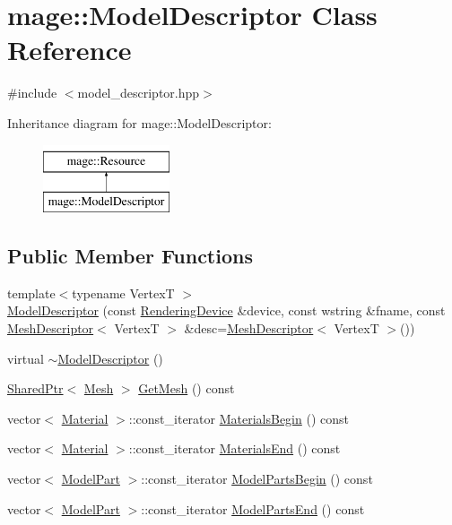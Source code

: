 \hypertarget{classmage_1_1_model_descriptor}{}\section{mage\+:\+:Model\+Descriptor Class Reference}
\label{classmage_1_1_model_descriptor}


{\ttfamily \#include $<$model\+\_\+descriptor.\+hpp$>$}

Inheritance diagram for mage\+:\+:Model\+Descriptor\+:\begin{figure}[H]
\begin{center}
\leavevmode
\includegraphics[height=2.000000cm]{classmage_1_1_model_descriptor}
\end{center}
\end{figure}
\subsection*{Public Member Functions}
\begin{DoxyCompactItemize}
\item 
{\footnotesize template$<$typename VertexT $>$ }\\\hyperlink{classmage_1_1_model_descriptor_afbaa21bc79c40d3448c83a23c134ef2c}{Model\+Descriptor} (const \hyperlink{classmage_1_1_rendering_device}{Rendering\+Device} \&device, const wstring \&fname, const \hyperlink{structmage_1_1_mesh_descriptor}{Mesh\+Descriptor}$<$ VertexT $>$ \&desc=\hyperlink{structmage_1_1_mesh_descriptor}{Mesh\+Descriptor}$<$ VertexT $>$())
\item 
virtual \hyperlink{classmage_1_1_model_descriptor_a3bc8ee3d1cb8d2675374727edce3d593}{$\sim$\+Model\+Descriptor} ()
\item 
\hyperlink{namespacemage_a1e01ae66713838a7a67d30e44c67703e}{Shared\+Ptr}$<$ \hyperlink{classmage_1_1_mesh}{Mesh} $>$ \hyperlink{classmage_1_1_model_descriptor_a325f0e58fda7734ace7a0e296e0d970d}{Get\+Mesh} () const
\item 
vector$<$ \hyperlink{structmage_1_1_material}{Material} $>$\+::const\+\_\+iterator \hyperlink{classmage_1_1_model_descriptor_a64a2ca531c03cd8d79eda3a728e6efa1}{Materials\+Begin} () const
\item 
vector$<$ \hyperlink{structmage_1_1_material}{Material} $>$\+::const\+\_\+iterator \hyperlink{classmage_1_1_model_descriptor_a3e1880190d58d4d1bc308766f804047d}{Materials\+End} () const
\item 
vector$<$ \hyperlink{structmage_1_1_model_part}{Model\+Part} $>$\+::const\+\_\+iterator \hyperlink{classmage_1_1_model_descriptor_a721a81fae1d5613af8a3a037577ce454}{Model\+Parts\+Begin} () const
\item 
vector$<$ \hyperlink{structmage_1_1_model_part}{Model\+Part} $>$\+::const\+\_\+iterator \hyperlink{classmage_1_1_model_descriptor_a97f78d3e5a157020f62f5e6003deaac6}{Model\+Parts\+End} () const
\end{DoxyCompactItemize}
